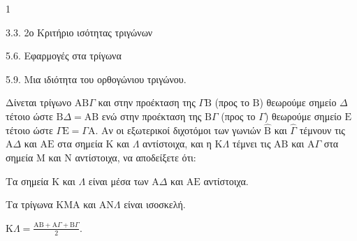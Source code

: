 \begin{ylh}{1}
    \item 3.3. 2ο Κριτήριο ισότητας τριγώνων
    \item 5.6. Εφαρμογές στα τρίγωνα
    \item 5.9. Μια ιδιότητα του ορθογώνιου τριγώνου.
\end{ylh}
Δίνεται τρίγωνο $\mathrm{A}\mathrm{B}\Gamma$ και στην προέκταση της $\Gamma\mathrm{B}$ (προς το $\mathrm{B}$) θεωρούμε σημείο $\Delta$ τέτοιο ώστε $\mathrm{B}\Delta = \mathrm{A}\mathrm{B}$ ενώ στην προέκταση της $\mathrm{B}\Gamma$ (προς το $\Gamma$) θεωρούμε σημείο $\mathrm{E}$ τέτοιο ώστε $\Gamma\mathrm{E} = \Gamma\mathrm{A}$.
Αν οι εξωτερικοί διχοτόμοι των γωνιών $\hat{\mathrm{B}}$ και $\hat{\Gamma}$ τέμνουν τις $\mathrm{A}\Delta$ και $\mathrm{A}\mathrm{E}$ στα σημεία $\mathrm{K}$ και $\Lambda$ αντίστοιχα, και η $\mathrm{K}\Lambda$ τέμνει τις $\mathrm{A}\mathrm{B}$ και $\mathrm{A}\Gamma$ στα σημεία $\mathrm{M}$ και $\mathrm{N}$ αντίστοιχα, να αποδείξετε ότι:
\begin{alist}
    \item Τα σημεία $\mathrm{K}$ και $\Lambda$ είναι μέσα των $\mathrm{A}\Delta$ και $\mathrm{A}\mathrm{E}$ αντίστοιχα. 
    \item Τα τρίγωνα $\mathrm{K}\mathrm{M}\mathrm{A}$ και $\mathrm{A}\mathrm{N}\Lambda$ είναι ισοσκελή. 
    \item $\mathrm{K}\Lambda = \frac{\mathrm{A}\mathrm{B} + \mathrm{A}\Gamma + \mathrm{B}\Gamma}{2}$. 
\end{alist}
